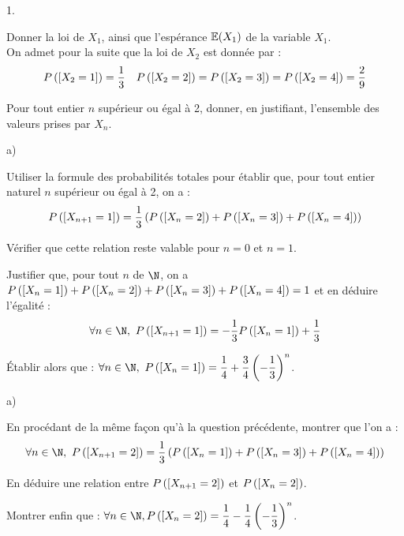 \documentclass[11pt]{article}%
\begin{document}
\begin{noliste}{1.}
  \setlength{\itemsep}{4mm}
\item Donner la loi de $X_{1}$, ainsi que l'espérance $\mathbb{E}(X_{1})$ de
  la variable $X_{1}$.\\
  On admet pour la suite que la loi de $X_{2}$ est donnée par :
  \[
  P\left(\left[ {X_{2} = 1} \right]\right) = \dfrac{1}{3} \quad P\left(\left[ {X_{2} =
      2} \right]\right) = P\left(\left[ {X_{2} = 3} \right]\right) = P\left(\left[ {X_{2} = 4} \right]\right)
  = \dfrac{2}{9}
  \]

\item Pour tout entier $n$ supérieur ou égal à 2, donner, en
  justifiant, l'ensemble des valeurs prises par $X_{n}$.

\item
  \begin{noliste}{a)}
    \setlength{\itemsep}{2mm}
  \item Utiliser la formule des probabilités totales pour établir que,
    pour tout entier naturel $n$ supérieur ou égal à 2, on a :
    \[
    P\left(\left[ {X_{n + 1} = 1} \right]\right) =
    \dfrac{1}{3}\left(P\left(\left[ {X_{n} = 2} \right]\right) + P\left(\left[ {X_{n}
          = 3} \right]\right) + P\left(\left[ {X_{n} = 4} \right]\right)\right)
    \]
  \item Vérifier que cette relation reste valable pour $n = 0$ et $n =
    1$.
  \item Justifier que, pour tout $n$ de $\N$, on a $P\left(\left[ {X_{n} =
        1} \right]\right) + P\left(\left[ {X_{n} = 2} \right]\right) + P\left(\left[ {X_{n} =
        3} \right]\right) + P\left(\left[ {X_{n} = 4} \right]\right) = 1$ et en déduire
    l'égalité :
    \[
    \forall n \in \N, \ P\left(\Ev{X_{n + 1} = 1}\right) =
    -\dfrac{1}{3} P\left(\Ev{X_{n} = 1}\right) + \dfrac{1}{3}
    \]
  \item Établir alors que : $\forall n \in \N, \ P\left(\Ev{X_{n} =
        1}\right) = \dfrac{1}{4} +
    \dfrac{3}{4}\left(-\dfrac{1}{3}\right)^{n}$.
  \end{noliste}
  
\item
  \begin{noliste}{a)}
    \setlength{\itemsep}{2mm}
  \item En procédant de la même façon qu'à la question précédente,
    montrer que l'on a :
    \[
    \forall n \in \N, \ P\left(\Ev{X_{n + 1} = 2}\right) =
    \dfrac{1}{3}\left( P\left(\Ev{X_{n} = 1}\right) + P\left(\Ev{X_{n}
          = 3}\right) + P\left(\Ev{X_{n} = 4}\right)\right)
    \]
  \item En déduire une relation entre $P\left(\left[ {X_{n + 1} =
        2} \right]\right)$ et $P\left(\left[ {X_{n} = 2} \right]\right)$.
  \item Montrer enfin que : $\forall n \in \N, P\left(\Ev{X_{n} =
        2}\right) =
    \dfrac{1}{4}-\dfrac{1}{4}\left(-\dfrac{1}{3}\right)^{n}$.
  \end{noliste}


\end{noliste}
\end{document}
